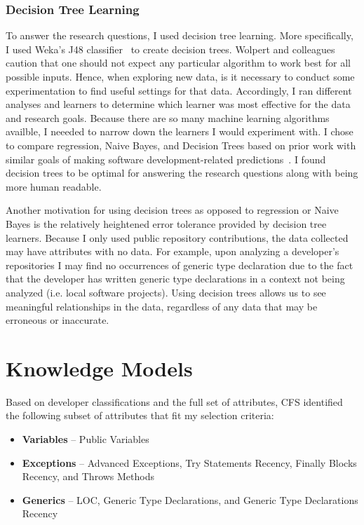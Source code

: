 \subsubsection{Decision Tree Learning}
To answer the research questions, I used decision tree learning. 
More specifically, I used Weka's J48 classifier~\cite{witten1999weka} to create decision trees. 
Wolpert and colleagues~\cite{wolpert1997no} caution that one should not expect any particular algorithm to work best for all possible inputs. Hence, when exploring new data, is it necessary to conduct some experimentation to find useful settings for that data. Accordingly, I ran different analyses and learners to determine which learner was most effective for the data and research goals. Because there are so many machine learning algorithms availble, I neeeded to narrow down the learners I would experiment with. I chose to compare regression, Naive Bayes, and Decision Trees based on prior work with similar goals of making software development-related predictions~\cite{menzies2004assessing,menzies2007data,heckman2009model,fritz2010degree}. I found decision trees to be optimal for answering the research questions along with being more human readable.

Another motivation for using decision trees as opposed to regression or Naive Bayes is the relatively heightened error tolerance provided by decision tree learners. Because I only used public repository contributions, the data collected may have attributes with no data. For example, upon analyzing a developer's repositories I may find no occurrences of generic type declaration due to the fact that the developer has written generic type declarations in a context not being analyzed (i.e. local software projects). Using decision trees allows us to see meaningful relationships in the data, regardless of any data that may be erroneous or inaccurate.

\section{Knowledge Models}\label{sec:eval}

Based on developer classifications and the full set of attributes, CFS identified the following subset of attributes that fit my selection criteria:
\begin{itemize}
    \item \textbf{Variables} -- Public Variables
    \item \textbf{Exceptions} -- Advanced Exceptions, Try Statements Recency, Finally Blocks Recency, and Throws Methods
	\item \textbf{Generics} -- LOC, Generic Type Declarations, and Generic Type Declarations Recency
\end{itemize}

